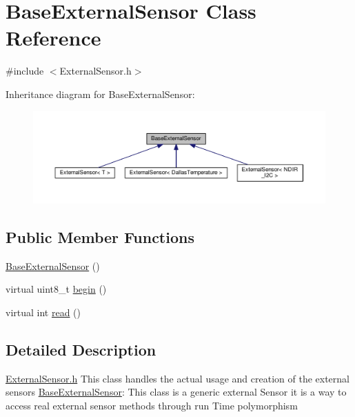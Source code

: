 \hypertarget{class_base_external_sensor}{}\section{Base\+External\+Sensor Class Reference}
\label{class_base_external_sensor}


{\ttfamily \#include $<$External\+Sensor.\+h$>$}



Inheritance diagram for Base\+External\+Sensor\+:\nopagebreak
\begin{figure}[H]
\begin{center}
\leavevmode
\includegraphics[width=350pt]{class_base_external_sensor__inherit__graph}
\end{center}
\end{figure}
\subsection*{Public Member Functions}
\begin{DoxyCompactItemize}
\item 
\hyperlink{class_base_external_sensor_a978d96a6563b646efb358c2790a9fc6f}{Base\+External\+Sensor} ()
\item 
virtual uint8\+\_\+t \hyperlink{class_base_external_sensor_a87d132803d4f4fdd4e66332809f0c9a0}{begin} ()
\item 
virtual int \hyperlink{class_base_external_sensor_a7e0a98f350148d7645031315657aa5ec}{read} ()
\end{DoxyCompactItemize}


\subsection{Detailed Description}
\hyperlink{_external_sensor_8h}{External\+Sensor.\+h} This class handles the actual usage and creation of the external sensors \hyperlink{class_base_external_sensor}{Base\+External\+Sensor}\+: This class is a generic external Sensor it is a way to access real external sensor methods through run Time polymorphism 

